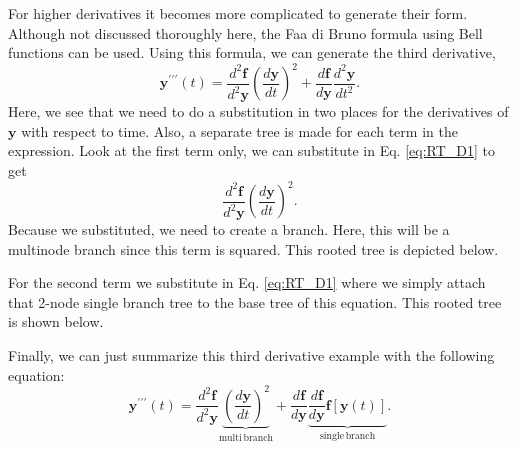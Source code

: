\documentclass{ansconf}
\numberwithin{equation}{section}
\begin{document}
For higher derivatives it becomes more complicated to generate their form. Although not discussed thoroughly here, the Faa di Bruno formula using Bell functions can be used. Using this formula, we can generate the third derivative,
\begin{equation}
    \mathbf{y}^{\prime\prime\prime}\left(t\right) = \frac{d^2\mathbf{f}}{d^2\mathbf{y}}\left(\frac{d\mathbf{y}}{dt}\right)^2 + \frac{d\mathbf{f}}{d\mathbf{y}} \frac{d^2\mathbf{y}}{dt^2}.
\end{equation}
Here, we see that we need to do a substitution in two places for the derivatives of $\mathbf{y}$ with respect to time. Also, a separate tree is made for each term in the expression. Look at the first term only, we can substitute in Eq. \ref{eq:RT_D1} to get
\begin{equation}
    \frac{d^2\mathbf{f}}{d^2\mathbf{y}}\left(\frac{d\mathbf{y}}{dt}\right)^2.
\end{equation}
Because we substituted, we need to create a branch. Here, this will be a multinode branch since this term is squared. This rooted tree is depicted below.\\
\begin{center}\end{center}
For the second term we substitute in Eq. \ref{eq:RT_D1} where we simply attach that 2-node single branch tree to the base tree of this equation. This rooted tree is shown below. \\
\begin{center}\end{center}
Finally, we can just summarize this third derivative example with the following equation:
\begin{equation}
    \mathbf{y}^{\prime\prime\prime}\left(t\right) = \frac{d^2\mathbf{f}}{d^2\mathbf{y}}\underbrace{\left(\frac{d\mathbf{y}}{dt}\right)^2}_{\mathrm{multi\,branch}} + \frac{d\mathbf{f}}{d\mathbf{y}} \underbrace{\frac{d\mathbf{f}}{d\mathbf{y}}\mathbf{f}\left[\mathbf{y}\left(t\right)\right]}
    _{\mathrm{single\,branch}}.
\end{equation}
\end{document}
